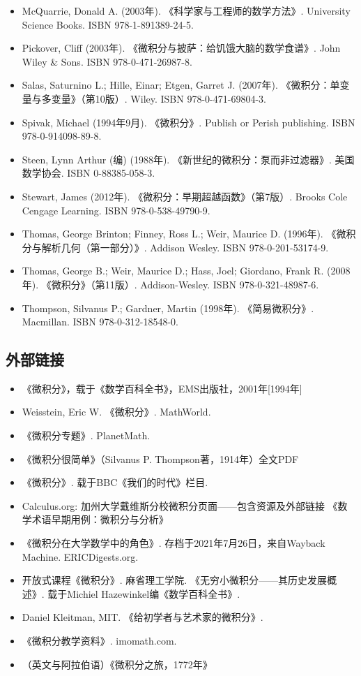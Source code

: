 \begin{itemize}
\item McQuarrie, Donald A. (2003年). 《科学家与工程师的数学方法》. University Science Books. ISBN 978-1-891389-24-5.
\item Pickover, Cliff (2003年). 《微积分与披萨：给饥饿大脑的数学食谱》. John Wiley & Sons. ISBN 978-0-471-26987-8.
\item Salas, Saturnino L.; Hille, Einar; Etgen, Garret J. (2007年). 《微积分：单变量与多变量》（第10版）. Wiley. ISBN 978-0-471-69804-3.
\item Spivak, Michael (1994年9月). 《微积分》. Publish or Perish publishing. ISBN 978-0-914098-89-8.
\item Steen, Lynn Arthur (编) (1988年). 《新世纪的微积分：泵而非过滤器》. 美国数学协会. ISBN 0-88385-058-3.
\item Stewart, James (2012年). 《微积分：早期超越函数》（第7版）. Brooks Cole Cengage Learning. ISBN 978-0-538-49790-9.
\item Thomas, George Brinton; Finney, Ross L.; Weir, Maurice D. (1996年). 《微积分与解析几何（第一部分）》. Addison Wesley. ISBN 978-0-201-53174-9.
\item Thomas, George B.; Weir, Maurice D.; Hass, Joel; Giordano, Frank R. (2008年). 《微积分》（第11版）. Addison-Wesley. ISBN 978-0-321-48987-6.
\item Thompson, Silvanus P.; Gardner, Martin (1998年). 《简易微积分》. Macmillan. ISBN 978-0-312-18548-0.
\end{itemize}
\subsection{外部链接}
\begin{itemize}
\item 《微积分》，载于《数学百科全书》，EMS出版社，2001年[1994年]
\item Weisstein, Eric W. 《微积分》. MathWorld.
\item 《微积分专题》. PlanetMath.
\item 《微积分很简单》（Silvanus P. Thompson著，1914年）全文PDF
\item 《微积分》. 载于BBC《我们的时代》栏目.
\item Calculus.org: 加州大学戴维斯分校微积分页面——包含资源及外部链接
《数学术语早期用例：微积分与分析》
\item 《微积分在大学数学中的角色》. 存档于2021年7月26日，来自Wayback Machine. ERICDigests.org.
\item 开放式课程《微积分》. 麻省理工学院.
《无穷小微积分——其历史发展概述》. 载于Michiel Hazewinkel编《数学百科全书》.
\item Daniel Kleitman, MIT. 《给初学者与艺术家的微积分》.
\item 《微积分教学资料》. imomath.com.
\item （英文与阿拉伯语）《微积分之旅，1772年》
\end{itemize}